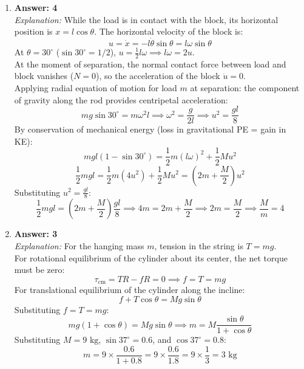 \documentclass[11pt,a4paper]{article}
\begin{document}
\begin{enumerate}[label=\textbf{Q\arabic*.},leftmargin=24pt,itemsep=12pt,start=21]
  \item \textbf{Answer: 4}\\
  \textit{Explanation:} While the load is in contact with the block, its horizontal position is $x = l \cos\theta$. The horizontal velocity of the block is:
  \[
    u = \dot{x} = -l \dot{\theta} \sin\theta = l \omega \sin\theta
  \]
  At $\theta = 30^\circ$ ($\sin 30^\circ = 1/2$), $u = \frac{1}{2} l \omega \implies l \omega = 2u$.\\
  At the moment of separation, the normal contact force between load and block vanishes ($N = 0$), so the acceleration of the block $\dot{u} = 0$.\\
  Applying radial equation of motion for load $m$ at separation: the component of gravity along the rod provides centripetal acceleration:
  \[
    m g \sin 30^\circ = m \omega^2 l \implies \omega^2 = \frac{g}{2l} \implies u^2 = \frac{g l}{8}
  \]
  By conservation of mechanical energy (loss in gravitational PE = gain in KE):
  \[
    m g l (1 - \sin 30^\circ) = \frac{1}{2} m (l \omega)^2 + \frac{1}{2} M u^2
  \]
  \[
    \frac{1}{2} m g l = \frac{1}{2} m (4 u^2) + \frac{1}{2} M u^2 = \left(2m + \frac{M}{2}\right) u^2
  \]
  Substituting $u^2 = \frac{gl}{8}$:
  \[
    \frac{1}{2} m g l = \left(2m + \frac{M}{2}\right) \frac{g l}{8} \implies 4m = 2m + \frac{M}{2} \implies 2m = \frac{M}{2} \implies \frac{M}{m} = 4
  \]

  \item \textbf{Answer: 3}\\
  \textit{Explanation:} For the hanging mass $m$, tension in the string is $T = mg$.\\
  For rotational equilibrium of the cylinder about its center, the net torque must be zero:
  \[
    \tau_{\text{cm}} = T R - f R = 0 \implies f = T = mg
  \]
  For translational equilibrium of the cylinder along the incline:
  \[
    f + T \cos\theta = M g \sin\theta
  \]
  Substituting $f = T = mg$:
  \[
    mg (1 + \cos\theta) = M g \sin\theta \implies m = M \frac{\sin\theta}{1 + \cos\theta}
  \]
  Substituting $M = 9\text{ kg}$, $\sin 37^\circ = 0.6$, and $\cos 37^\circ = 0.8$:
  \[
    m = 9 \times \frac{0.6}{1 + 0.8} = 9 \times \frac{0.6}{1.8} = 9 \times \frac{1}{3} = 3\text{ kg}
  \]

\end{enumerate}
\end{document}
